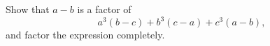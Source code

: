 Show that \(a-b\) is a factor of
\[
a^3(b-c)+b^3(c-a)+c^3(a-b),
\]
and factor the expression completely.
